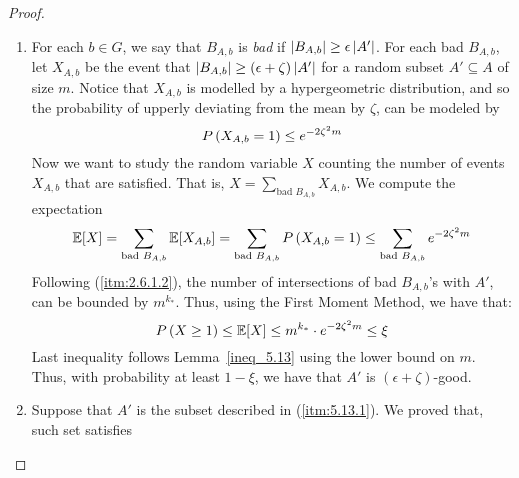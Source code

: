 \begin{proof}
\begin{enumerate}[label=(\alph*), ref=\alph*]
            \item For each $b \in G$, we say that $B_{A,b}$ is \emph{bad} if $\left| B_{A,b} \right| \geq \epsilon \left| A' \right|$.
                For each bad $B_{A,b}$, let $X_{A,b}$ be the event that
                $\left| B_{A,b} \right| \geq \left( \epsilon + \zeta \right) \left| A' \right|$ for a random subset
                $A' \subseteq A$ of size $m$.
                Notice that $X_{A,b}$ is modelled by a hypergeometric distribution, and so the probability of
                upperly deviating from the mean by $\zeta$, can be modeled by
                \[
                    P\left( X_{A,b} = 1 \right) \leq e^{-2\zeta^2 m}
                \]
                Now we want to study the random variable $X$ counting the number of events $X_{A,b}$ that are satisfied.
                That is, $X = \sum_{\text{bad } B_{A,b}} X_{A,b}$.
                We compute the expectation
                \[
                    \mathbb{E}[X] = \sum_{\text{bad } B_{A,b}} \mathbb{E}[X_{A,b}]
                        = \sum_{\text{bad } B_{A,b}} P\left( X_{A,b} = 1 \right)
                        \leq \sum_{\text{bad } B_{A,b}} e^{-2\zeta^2 m}
                \]
                Following (\ref{itm:2.6.1.2}), the number of intersections of bad $B_{A,b}$'s with $A'$, can be bounded
                by $m^{k_*}$.
                Thus, using the First Moment Method, we have that:
                \[
                    P\left( X \geq 1 \right) \leq \mathbb{E}[X] \leq m^{k_*} \cdot e^{-2\zeta^2 m} \leq \xi
                \]
                Last inequality follows Lemma~\ref{ineq_5.13} using the lower bound on $m$.
                Thus, with probability at least $1 - \xi$, we have that $A'$ is $(\epsilon + \zeta)$-good.
            \item Suppose that $A'$ is the subset described in (\ref{itm:5.13.1}).
                We proved that, such set satisfies

\end{enumerate}
\end{proof}
